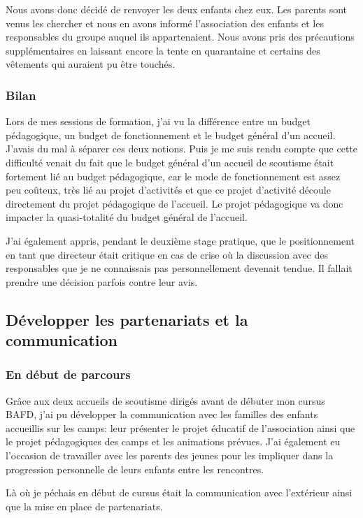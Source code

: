 \documentclass[titlepage,11pt,a4paper]{article}
\begin{document}
Nous avons donc décidé de renvoyer les deux enfants chez eux. Les parents sont venus les
chercher et nous en avons informé l'association des enfants et les responsables du groupe
auquel ils appartenaient. Nous avons pris des précautions supplémentaires en laissant
encore la tente en quarantaine et certains des vêtements qui auraient pu être touchés.

\subsubsection{Bilan}

Lors de mes sessions de formation, j'ai vu la différence entre un budget pédagogique, un
budget de fonctionnement et le budget général d'un accueil. J'avais du mal à séparer ces deux notions. Puis je
me suis rendu compte que cette difficulté venait du fait que le budget général d'un
accueil de scoutisme était fortement lié au budget pédagogique, car le mode de
fonctionnement est assez peu coûteux, très lié au projet d'activités et que ce projet
d'activité découle directement du projet pédagogique de l'accueil. Le projet pédagogique
va donc impacter la quasi-totalité du budget général de l'accueil.

J'ai également appris, pendant le deuxième stage pratique, que le positionnement en tant
que directeur était critique en cas de crise où la discussion avec des responsables que je
ne connaissais pas personnellement devenait tendue. Il fallait prendre une décision
parfois contre leur avis.


\subsection{Développer les partenariats et la communication}
\subsubsection{En début de parcours}

Grâce aux deux accueils de scoutisme dirigés avant de débuter mon cursus BAFD, j'ai
pu développer la communication avec les familles des enfants accueillis sur les camps:
leur présenter le projet éducatif de l'association ainsi que le projet pédagogiques des
camps et les animations prévues. J'ai également eu l'occasion de travailler avec les parents des jeunes pour les impliquer
dans la progression personnelle de leurs enfants entre les rencontres.

Là où je péchais en début de cursus était la communication avec l'extérieur ainsi que la
mise en place de partenariats.
\end{document}
